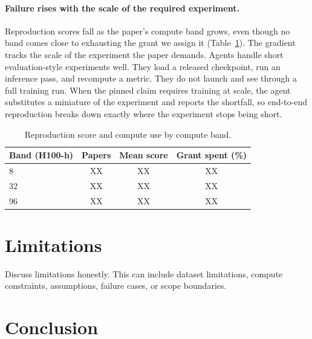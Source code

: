 \documentclass{article} %
\begin{document}

\paragraph{Failure rises with the scale of the required experiment.}
Reproduction scores fall as the paper's compute band grows, even though no
band comes close to exhausting the grant we assign it
(Table~\ref{tab:band-compute}). The gradient tracks the scale of the
experiment the paper demands.
Agents handle short evaluation-style experiments well. They load a released
checkpoint, run an inference pass, and recompute a metric. They do not
launch and see through a full training run. When the pinned claim requires
training at scale, the agent substitutes a miniature of the experiment and
reports the shortfall, so end-to-end reproduction breaks down exactly where
the experiment stops being short.

\begin{table}[h]
\caption{Reproduction score and compute use by compute band.
}
\label{tab:band-compute}
\begin{center}
\small
\begin{tabular}{@{}lccc@{}}
\toprule
Band (H100-h) & Papers & Mean score & Grant spent (\%) \\
\midrule
8 & XX & XX & XX \\
32 & XX & XX & XX \\
96 & XX & XX & XX \\
\bottomrule
\end{tabular}
\end{center}
\end{table}

\section{Limitations}
\label{sec:limitations}

Discuss limitations honestly. This can include dataset limitations, compute constraints, assumptions, failure cases, or scope boundaries.

\section{Conclusion}
\label{sec:conclusion}
\end{document}
